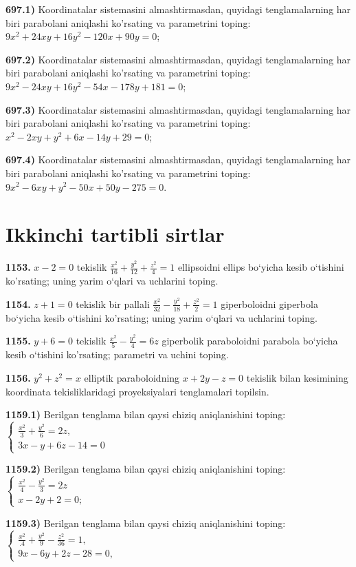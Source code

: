 \textbf{697.1)} Koordinatalar sistemasini almashtirmasdan, quyidagi tenglamalarning har biri parabolani aniqlashi ko'rsating va parametrini toping: $9 x^2+24 x y+16 y^2-120 x+90 y=0$;

\textbf{697.2)} Koordinatalar sistemasini almashtirmasdan, quyidagi tenglamalarning har biri parabolani aniqlashi ko'rsating va parametrini toping: $9 x^2-24 x y+16 y^2-54 x-178 y+181=0$;

\textbf{697.3)} Koordinatalar sistemasini almashtirmasdan, quyidagi tenglamalarning har biri parabolani aniqlashi ko'rsating va parametrini toping: $x^2-2 x y+y^2+6 x-14 y+29=0$;

\textbf{697.4)} Koordinatalar sistemasini almashtirmasdan, quyidagi tenglamalarning har biri parabolani aniqlashi ko'rsating va parametrini toping: $9 x^2-6 x y+y^2-50 x+50 y-275=0$.



\section{Ikkinchi tartibli sirtlar}



\textbf{1153.} $x-2=0$ tekislik $\frac{x^2}{16}+\frac{y^2}{12}+\frac{z^2}{4}=1$ ellipsoidni ellips bo‘yicha kesib o‘tishini ko'rsating; uning yarim o‘qlari va uchlarini toping.

\textbf{1154.} $z+1=0$ tekislik bir pallali $\frac{x^2}{32}-\frac{y^2}{18}+\frac{z^2}{2}=1$ giperboloidni giperbola bo‘yicha kesib o‘tishini ko'rsating; uning yarim o‘qlari va uchlarini toping.

\textbf{1155.} $y+6=0$ tekislik $\frac{x^2}{5}-\frac{y^2}{4}=6 z$ giperbolik paraboloidni parabola bo‘yicha kesib o‘tishini ko'rsating; parametri va uchini toping.

\textbf{1156.} $y^2+z^2=x$ elliptik paraboloidning $x+2 y-z=0$ tekislik bilan kesimining koordinata tekisliklaridagi proyeksiyalari tenglamalari topilsin.

\textbf{1159.1)} Berilgan tenglama bilan qaysi chiziq aniqlanishini toping: $\left\{\begin{array}{l}\frac{x^2}{3}+\frac{y^2}{6}=2 z, \\ 3 x-y+6 z-14=0\end{array}\right.$

\textbf{1159.2)} Berilgan tenglama bilan qaysi chiziq aniqlanishini toping: $\left\{\begin{array}{l}\frac{x^2}{4}-\frac{y^2}{3}=2 z \\ x-2 y+2=0 ;\end{array}\right.$

\textbf{1159.3)} Berilgan tenglama bilan qaysi chiziq aniqlanishini toping: $\left\{\begin{array}{l}\frac{x^2}{.4}+\frac{y^2}{9}-\frac{z^2}{36}=1, \\ 9 x-6 y+2 z-28=0,\end{array}\right.$